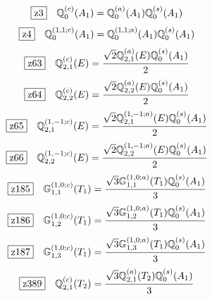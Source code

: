 \documentclass[fleqn,10pt,landscape]{jsarticle}
\begin{document}
\begin{dmath*}
\hspace*{3mm}\fbox{z3}\quad \mathbb{Q}_{0}^{(c)}(A_{1})=\mathbb{Q}_{0}^{(a)}(A_{1}) \mathbb{Q}_{0}^{(s)}(A_{1})
\end{dmath*}
\begin{dmath*}
\hspace*{3mm}\fbox{z4}\quad \mathbb{Q}_{0}^{(1,1;c)}(A_{1})=\mathbb{Q}_{0}^{(1,1;a)}(A_{1}) \mathbb{Q}_{0}^{(s)}(A_{1})
\end{dmath*}
\begin{dmath*}
\hspace*{3mm}\fbox{z63}\quad \mathbb{Q}_{2,1}^{(c)}(E)=\frac{\sqrt{2} \mathbb{Q}_{2,1}^{(a)}(E) \mathbb{Q}_{0}^{(s)}(A_{1})}{2}
\end{dmath*}
\begin{dmath*}
\hspace*{3mm}\fbox{z64}\quad \mathbb{Q}_{2,2}^{(c)}(E)=\frac{\sqrt{2} \mathbb{Q}_{2,2}^{(a)}(E) \mathbb{Q}_{0}^{(s)}(A_{1})}{2}
\end{dmath*}
\begin{dmath*}
\hspace*{3mm}\fbox{z65}\quad \mathbb{Q}_{2,1}^{(1,-1;c)}(E)=\frac{\sqrt{2} \mathbb{Q}_{2,1}^{(1,-1;a)}(E) \mathbb{Q}_{0}^{(s)}(A_{1})}{2}
\end{dmath*}
\begin{dmath*}
\hspace*{3mm}\fbox{z66}\quad \mathbb{Q}_{2,2}^{(1,-1;c)}(E)=\frac{\sqrt{2} \mathbb{Q}_{2,2}^{(1,-1;a)}(E) \mathbb{Q}_{0}^{(s)}(A_{1})}{2}
\end{dmath*}
\begin{dmath*}
\hspace*{3mm}\fbox{z185}\quad \mathbb{G}_{1,1}^{(1,0;c)}(T_{1})=\frac{\sqrt{3} \mathbb{G}_{1,1}^{(1,0;a)}(T_{1}) \mathbb{Q}_{0}^{(s)}(A_{1})}{3}
\end{dmath*}
\begin{dmath*}
\hspace*{3mm}\fbox{z186}\quad \mathbb{G}_{1,2}^{(1,0;c)}(T_{1})=\frac{\sqrt{3} \mathbb{G}_{1,2}^{(1,0;a)}(T_{1}) \mathbb{Q}_{0}^{(s)}(A_{1})}{3}
\end{dmath*}
\begin{dmath*}
\hspace*{3mm}\fbox{z187}\quad \mathbb{G}_{1,3}^{(1,0;c)}(T_{1})=\frac{\sqrt{3} \mathbb{G}_{1,3}^{(1,0;a)}(T_{1}) \mathbb{Q}_{0}^{(s)}(A_{1})}{3}
\end{dmath*}
\begin{dmath*}
\hspace*{3mm}\fbox{z389}\quad \mathbb{Q}_{2,1}^{(c)}(T_{2})=\frac{\sqrt{3} \mathbb{Q}_{2,1}^{(a)}(T_{2}) \mathbb{Q}_{0}^{(s)}(A_{1})}{3}
\end{dmath*}
\end{document}
